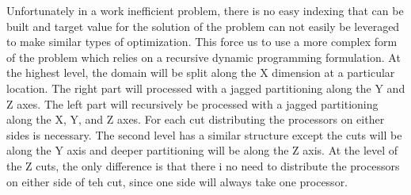 \documentclass[10pt, conference, compsocconf]{IEEEtran}
\begin{document}
Unfortunately in a work inefficient problem, there is no easy indexing
that can be built and target value for the solution of the problem can
not easily be leveraged to make similar types of optimization. This
force us to use a more complex form of the problem which relies on a
recursive dynamic programming formulation. At the highest level, the
domain will be split along the X dimension at a particular
location. The right part will processed with a jagged partitioning
along the Y and Z axes. The left part will recursively be processed
with a jagged partitioning along the X, Y, and Z axes. For each cut
distributing the processors on either sides is necessary. The second
level has a similar structure except the cuts will be along the Y axis
and deeper partitioning will be along the Z axis. At the level of the
Z cuts, the only difference is that there i no need to distribute the
processors on either side of teh cut, since one side will always take
one processor. 
\end{document}
